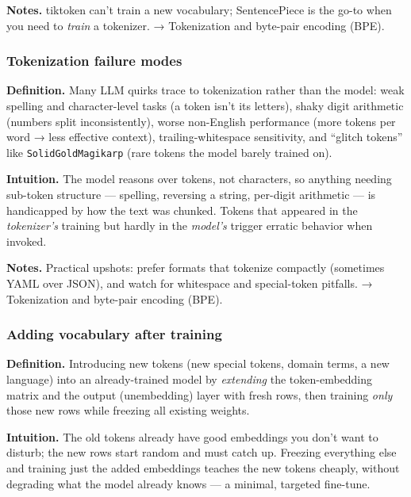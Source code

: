 \documentclass[
  10pt,
  letterpaper,
  onecolumn]{article}
\begin{document}
\textbf{Notes.} tiktoken can't train a new vocabulary; SentencePiece is
the go-to when you need to \emph{train} a tokenizer. → Tokenization and
byte-pair encoding (BPE).

\hypertarget{tokenization-failure-modes}{%
\subsubsection{Tokenization failure
modes}\label{tokenization-failure-modes}}

\textbf{Definition.} Many LLM quirks trace to tokenization rather than
the model: weak spelling and character-level tasks (a token isn't its
letters), shaky digit arithmetic (numbers split inconsistently), worse
non-English performance (more tokens per word → less effective context),
trailing-whitespace sensitivity, and ``glitch tokens'' like
\texttt{SolidGoldMagikarp} (rare tokens the model barely trained on).

\textbf{Intuition.} The model reasons over tokens, not characters, so
anything needing sub-token structure --- spelling, reversing a string,
per-digit arithmetic --- is handicapped by how the text was chunked.
Tokens that appeared in the \emph{tokenizer's} training but hardly in
the \emph{model's} trigger erratic behavior when invoked.

\textbf{Notes.} Practical upshots: prefer formats that tokenize
compactly (sometimes YAML over JSON), and watch for whitespace and
special-token pitfalls. → Tokenization and byte-pair encoding (BPE).

\hypertarget{adding-vocabulary-after-training}{%
\subsubsection{Adding vocabulary after
training}\label{adding-vocabulary-after-training}}

\textbf{Definition.} Introducing new tokens (new special tokens, domain
terms, a new language) into an already-trained model by \emph{extending}
the token-embedding matrix and the output (unembedding) layer with fresh
rows, then training \emph{only} those new rows while freezing all
existing weights.

\textbf{Intuition.} The old tokens already have good embeddings you
don't want to disturb; the new rows start random and must catch up.
Freezing everything else and training just the added embeddings teaches
the new tokens cheaply, without degrading what the model already knows
--- a minimal, targeted fine-tune.
\end{document}
